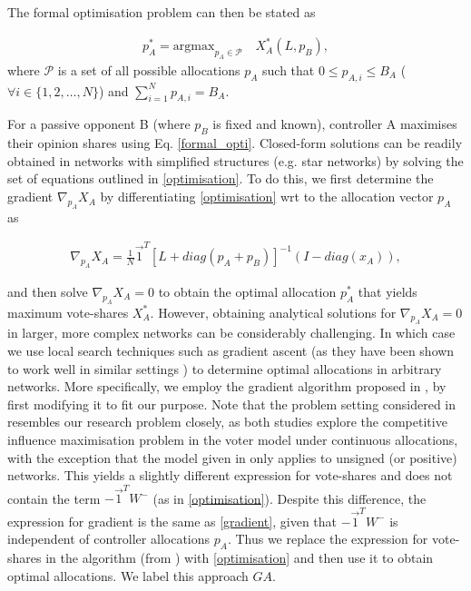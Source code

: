 The formal optimisation problem can then be stated as

\begin{align}
    p_{A}^* = \text{argmax}_{p_{A} \in \mathcal{P}} \quad X_{A}^*(L,p_{B}),
    \label{formal_opti}
\end{align}
where $\mathcal{P}$ is a set of all possible allocations $p_{A}$ such that $0 \leq p_{A,i} \leq B_{A}$ ($\forall i \in \{1,2,\ldots,N\}$) and $\sum\limits_{i=1}^N p_{A,i} = B_{A}$.


For a passive opponent B (where $p_{B}$ is fixed and known), controller A maximises their opinion shares using Eq. \ref{formal_opti}. 
Closed-form solutions can be readily obtained in networks with simplified structures (e.g. star networks) by solving the set of equations outlined in \cref{optimisation}. To do this, we first determine the gradient $\nabla_{p_{A}} X_{A}$ by differentiating \cref{optimisation} wrt to the allocation vector $p_{A}$ as

\begin{align}
    \nabla_{p_{A}} X_{A} = \frac{1}{N} \Vec{1}^{T} [L+diag(p_{A}+p_{B})] ^{-1} (I - diag(x_{A})),
    \label{gradient}
\end{align}

and then solve $\nabla_{p_{A}} X_{A}=0$ to obtain the optimal allocation $p_{A}^*$ that yields maximum vote-shares $X_{A}^*$. However, obtaining analytical solutions for $\nabla_{p_{A}} X_{A}=0$ in larger, more complex networks can be considerably challenging. In which case we use local search techniques such as gradient ascent (as they have been shown to work well in similar settings \cite{lynn2016maximizing,romero2021shadowing}) to determine optimal allocations in arbitrary networks. More specifically, we employ the gradient algorithm proposed in \cite{romero2021shadowing}, by first modifying it to fit our purpose. Note that the problem setting considered in \cite{romero2021shadowing} resembles our research problem closely, as both studies explore the competitive influence maximisation problem in the voter model under continuous allocations, with the exception that the model given in \cite{romero2021shadowing} only applies to unsigned (or positive) networks. This yields a slightly different expression for vote-shares and does not contain the term $-\vec{1}^T W^-$ (as in \cref{optimisation}). Despite this difference, the expression for gradient is the same as \cref{gradient}, given that $-\vec{1}^T W^-$ is independent of controller allocations $p_{A}$. Thus we replace the expression for vote-shares in the algorithm (from \cite{romero2021shadowing}) with \cref{optimisation} and then use it to obtain optimal allocations. We label this approach $GA$. 


